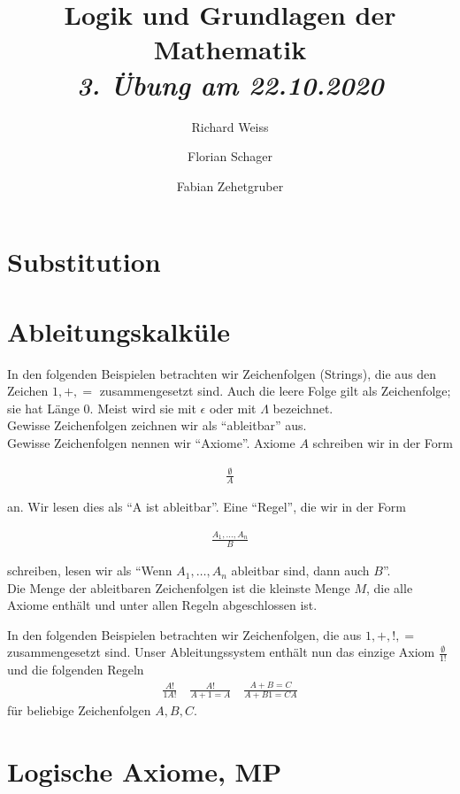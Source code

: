 \documentclass{article}
\title
{
  Logik und Grundlagen der Mathematik \\
  \vspace{4pt}
  \normalsize
  \textit{3. Übung am 22.10.2020}
}
\author
{
  Richard Weiss
  \and
  Florian Schager
  \and
  Fabian Zehetgruber
}
\date{}
\begin{document}
\maketitle

\section*{Substitution}




\section*{Ableitungskalküle}

In den folgenden Beispielen betrachten wir Zeichenfolgen (Strings), die aus
den Zeichen $1,+,=$ zusammengesetzt sind. Auch die leere Folge gilt als
Zeichenfolge; sie hat Länge $0$. Meist wird sie mit $\epsilon$ oder mit $\Lambda$
bezeichnet. \\
Gewisse Zeichenfolgen zeichnen wir als \enquote{ableitbar} aus. \\
Gewisse Zeichenfolgen nennen wir \enquote{Axiome}. Axiome $A$ schreiben wir in
der Form

\begin{align*}
  \frac{\emptyset}{A}
\end{align*}

an. Wir lesen dies als \enquote{A ist ableitbar}. Eine \enquote{Regel}, die wir in
der Form

\begin{align*}
  \frac{A_1,\dots,A_n}{B}
\end{align*}

schreiben, lesen wir als \enquote{Wenn $A_1,\dots,A_n$ ableitbar sind, dann auch $B$}. \\
Die Menge der ableitbaren Zeichenfolgen ist die kleinste Menge $M$, die alle
Axiome enthält und unter allen Regeln abgeschlossen ist.



In den folgenden Beispielen betrachten wir Zeichenfolgen, die aus $1,+,!,=$
zusammengesetzt sind. Unser Ableitungssystem enthält nun das einzige Axiom
$\frac{\emptyset}{1!}$ und die folgenden Regeln
\begin{align*}
  \frac{A!}{1A!} \quad \frac{A!}{A + 1 = A} \quad \frac{A + B = C}{A + B1 = CA}
\end{align*}
für beliebige Zeichenfolgen $A,B,C$.




\section*{Logische Axiome, MP}

\end{document}
